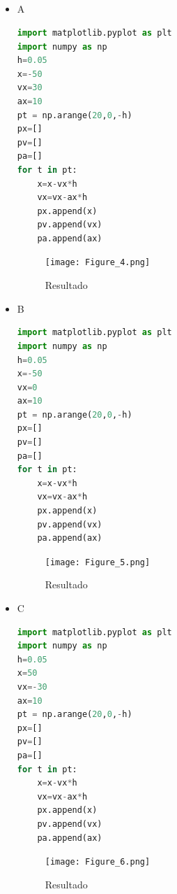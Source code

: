 \documentclass{article}
\begin{document}
\subsection{}
\begin{itemize}
    \item A
\begin{lstlisting}[language=Python,caption=Ejercicio 2.1]
import matplotlib.pyplot as plt
import numpy as np
h=0.05
x=-50
vx=30
ax=10
pt = np.arange(20,0,-h)
px=[]
pv=[]
pa=[]
for t in pt:
    x=x-vx*h
    vx=vx-ax*h
    px.append(x)
    pv.append(vx)
    pa.append(ax)
\end{lstlisting}
\begin{figure}[H]
    \centering
    \texttt{[image: Figure\_4.png]}
    \caption{Resultado}
\end{figure}

    \item B
\begin{lstlisting}[language=Python,caption=Ejercicio 2.1]
import matplotlib.pyplot as plt
import numpy as np
h=0.05
x=-50
vx=0
ax=10
pt = np.arange(20,0,-h)
px=[]
pv=[]
pa=[]
for t in pt:
    x=x-vx*h
    vx=vx-ax*h
    px.append(x)
    pv.append(vx)
    pa.append(ax)
\end{lstlisting}
\begin{figure}[H]
    \centering
    \texttt{[image: Figure\_5.png]}
    \caption{Resultado}
\end{figure}

    \item C
\begin{lstlisting}[language=Python,caption=Ejercicio 2.3]
import matplotlib.pyplot as plt
import numpy as np
h=0.05
x=50
vx=-30
ax=10
pt = np.arange(20,0,-h)
px=[]
pv=[]
pa=[]
for t in pt:
    x=x-vx*h
    vx=vx-ax*h
    px.append(x)
    pv.append(vx)
    pa.append(ax)
\end{lstlisting}
\begin{figure}[H]
    \centering
    \texttt{[image: Figure\_6.png]}
    \caption{Resultado}
\end{figure}

\end{itemize}


\end{document}
